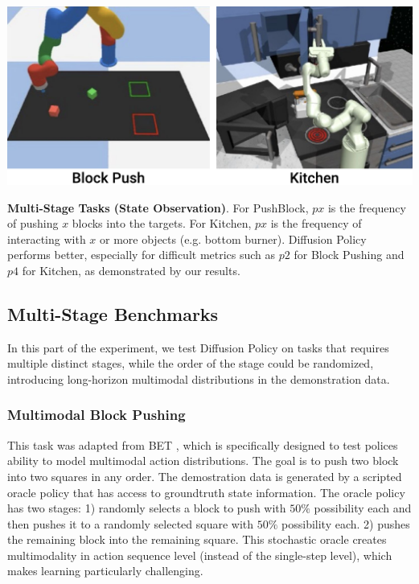 \begin{table}[t]
\centering
\includegraphics[width=0.9\linewidth]{figure/multitask_thumbnails.pdf}

\vspace{2mm}

\caption{\textbf{Multi-Stage Tasks (State Observation)}.
\label{tab:multi_stage}
For PushBlock, $px$ is the frequency of pushing $x$ blocks into the targets.
For Kitchen, $px$ is the frequency of interacting with $x$ or more objects (e.g. bottom burner).
Diffusion Policy performs better, especially for difficult metrics such as $p2$ for Block Pushing and $p4$ for Kitchen, as demonstrated by our results.
}
\end{table}


\subsection{Multi-Stage Benchmarks}
In this part of the experiment, we test Diffusion Policy on tasks that requires multiple distinct stages, while the order of the stage could be randomized, introducing long-horizon multimodal distributions in the demonstration data.

\subsubsection{\textbf{Multimodal Block Pushing}} This task was adapted from BET \cite{bet}, which is specifically designed to test polices ability to model multimodal action distributions. The goal is to push two block into two squares in any order. The demostration data is generated by a scripted oracle policy that has access to groundtruth state information. The oracle policy has two stages: 1) randomly selects a block to push with $50\% $ possibility each and then pushes it to a randomly selected square with $50\% $ possibility each. 2) pushes the remaining block into the remaining square. This stochastic oracle creates multimodality in action sequence level (instead of the single-step level), which makes learning particularly challenging.


